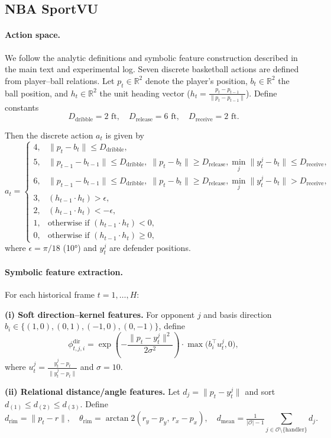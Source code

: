 \documentclass{article} %
\begin{document}
\subsection{NBA SportVU}
\label{Sec:B2}
\paragraph{Action space.}
We follow the analytic definitions and symbolic feature construction described in the main text and experimental log. Seven discrete basketball actions are defined from player--ball relations. Let $p_t \in \mathbb{R}^2$ denote the player’s position, $b_t \in \mathbb{R}^2$ the ball position, and $h_t \in \mathbb{R}^2$ the unit heading vector ($h_t = \frac{p_t - p_{t-1}}{\|p_t - p_{t-1}\|}$). Define constants
\[
D_{\text{dribble}}=2\text{ ft}, \quad D_{\text{release}}=6\text{ ft}, \quad D_{\text{receive}}=2\text{ ft}.
\]

Then the discrete action $a_t$ is given by
\[
a_t =
\begin{cases}
4, & \|p_t - b_t\| \le D_{\text{dribble}}, \\
5, & \|p_{t-1} - b_{t-1}\|\le D_{\text{dribble}},\; \|p_t-b_t\|\ge D_{\text{release}}, \min_j \|y_t^j - b_t\|\le D_{\text{receive}}, \\
6, & \|p_{t-1} - b_{t-1}\|\le D_{\text{dribble}},\; \|p_t-b_t\|\ge D_{\text{release}}, \min_j \|y_t^j - b_t\| > D_{\text{receive}}, \\
3, & (h_{t-1}\cdot h_t) > \epsilon, \\
2, & (h_{t-1}\cdot h_t) < -\epsilon, \\
1, & \text{otherwise if } (h_{t-1}\cdot h_t) < 0, \\
0, & \text{otherwise if } (h_{t-1}\cdot h_t) \ge 0,
\end{cases}
\]
where $\epsilon = \pi/18$ (10°) and $y_t^j$ are defender positions.
\paragraph{Symbolic feature extraction.}
For each historical frame $t=1,\dots,H$:

\textbf{(i) Soft direction–kernel features.}  
For opponent $j$ and basis direction $b_i \in \{(1,0),(0,1),(-1,0),(0,-1)\}$, define
\[
\phi_{t,j,i}^{\text{dir}} = \exp\!\left(-\frac{\|p_t-y_t^j\|^2}{2\sigma^2}\right) \cdot \max\!\big(b_i^\top u_t^j, 0\big),
\]
where $u_t^j = \frac{y_t^j - p_t}{\|y_t^j - p_t\|}$ and $\sigma=10$.

\textbf{(ii) Relational distance/angle features.}  
Let $d_j = \|p_t - y_t^j\|$ and sort $d_{(1)} \le d_{(2)} \le d_{(3)}$. Define
\[
d_{\text{rim}} = \|p_t - r\|,\quad \theta_{\text{rim}} = \arctan2(r_y - p_y,\, r_x - p_x),\quad 
d_{\text{mean}} = \tfrac{1}{|\mathcal O| - 1}\sum_{j\in\mathcal O\setminus\{\text{handler}\}} d_j .
\]
\end{document}
